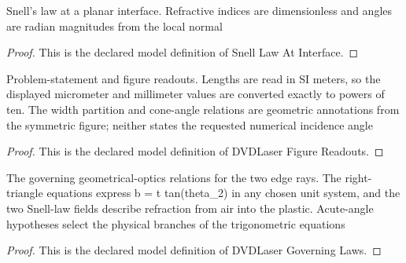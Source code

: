 \begin{definition}
  \label{def:physics:phyx-mini-0013:phyxminiproblems-problemphyxmini0013-snelllawatinterface}
  Snell's law at a planar interface. Refractive indices are dimensionless and angles are radian magnitudes from the local normal
\end{definition}
\begin{proof}
  This is the declared model definition of Snell Law At Interface.
\end{proof}
\begin{definition}
  \label{def:physics:phyx-mini-0013:phyxminiproblems-problemphyxmini0013-dvdlaserfigurereadouts}
  Problem-statement and figure readouts. Lengths are read in SI meters, so the displayed micrometer and millimeter values are converted exactly to powers of ten. The width partition and cone-angle relations are geometric annotations from the symmetric figure; neither states the requested numerical incidence angle
\end{definition}
\begin{proof}
  This is the declared model definition of DVDLaser Figure Readouts.
\end{proof}
\begin{definition}
  \label{def:physics:phyx-mini-0013:phyxminiproblems-problemphyxmini0013-dvdlasergoverninglaws}
  The governing geometrical-optics relations for the two edge rays. The right-triangle equations express b = t tan(theta\_2) in any chosen unit system, and the two Snell-law fields describe refraction from air into the plastic. Acute-angle hypotheses select the physical branches of the trigonometric equations
\end{definition}
\begin{proof}
  This is the declared model definition of DVDLaser Governing Laws.
\end{proof}
